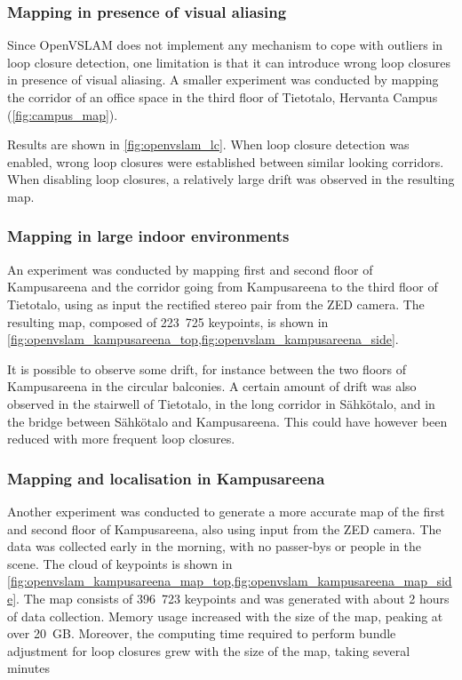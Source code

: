 \documentclass[11pt, letterpaper, twoside]{article}
\begin{document}
\subsubsection{Mapping in presence of visual aliasing}

Since OpenVSLAM does not implement any mechanism to cope with outliers in loop
closure detection, one limitation is that it can introduce wrong loop closures
in presence of visual aliasing. A smaller experiment was conducted by mapping
the corridor of an office space in the third floor of Tietotalo, Hervanta
Campus (\cref{fig:campus_map}).

Results are shown in \cref{fig:openvslam_lc}. When loop closure detection was
enabled, wrong loop closures were established between similar looking
corridors. When disabling loop closures, a relatively large drift was observed
in the resulting map.

\subsubsection{Mapping in large indoor environments}

An experiment was conducted by mapping first and second floor of Kampusareena
and the corridor going from Kampusareena to the third floor of Tietotalo, using
as input the rectified stereo pair from the ZED camera. The resulting map,
composed of 223~725 keypoints, is shown in
\cref{fig:openvslam_kampusareena_top,fig:openvslam_kampusareena_side}.

It is possible to observe some drift, for instance between the two floors of
Kampusareena in the circular balconies. A certain amount of drift was also
observed in the stairwell of Tietotalo, in the long corridor in Sähkötalo, and
in the bridge between Sähkötalo and Kampusareena. This could have however been
reduced with more frequent loop closures.

\subsubsection{Mapping and localisation in Kampusareena}

Another experiment was conducted to generate a more accurate map of the first
and second floor of Kampusareena, also using input from the ZED camera. The
data was collected early in the morning, with no passer-bys or people in the
scene. The cloud of keypoints is shown in
\cref{fig:openvslam_kampusareena_map_top,fig:openvslam_kampusareena_map_side}.
The map consists of 396~723 keypoints and was generated with about 2 hours of
data collection. Memory usage increased with the size of the map, peaking at
over 20~GB. Moreover, the computing time required to perform bundle adjustment
for loop closures grew with the size of the map, taking several minutes
\end{document}
